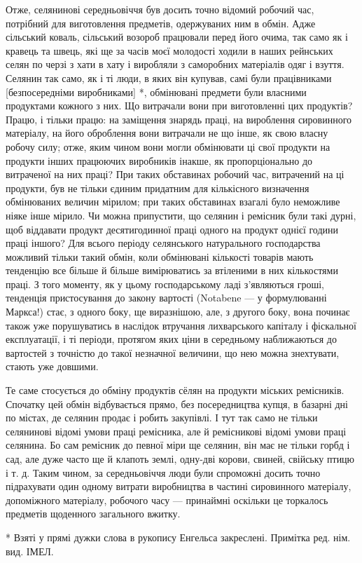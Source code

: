 Отже, селянинові середньовіччя був досить точно відомий робочий час, потрібний для виготовлення предметів, одержуваних ним в
обмін. Адже сільський коваль, сільський возороб працювали перед його очима, так само як і кравець та швець, які ще за часів
моєї молодості ходили в наших рейнських селян по черзі з хати в хату і виробляли з саморобних матеріалів одяг і взуття.
Селянин так само, як і ті люди, в яких він купував, самі були працівниками [безпосередніми виробниками] *, обмінювані
предмети були власними продуктами кожного з них. Що витрачали вони при виготовленні цих продуктів? Працю, і тільки працю: на
заміщення знарядь праці, на вироблення сировинного матеріалу, на його оброблення вони витрачали не що інше, як свою власну
робочу силу; отже, яким чином вони могли обмінювати ці свої продукти на продукти інших працюючих виробників інакше, як
пропорціонально до витраченої на них праці?  При таких обставинах робочий час, витрачений на ці продукти, був не тільки
єдиним придатним для кількісного визначення обмінюваних величин мірилом; при таких обставинах взагалі було неможливе ніяке
інше мірило. Чи можна припустити, що селянин і ремісник були такі дурні, щоб віддавати продукт десятигодинної праці одного
на продукт однієї години праці іншого? Для всього періоду селянського натурального господарства можливий тільки такий
обмін, коли обмінювані кількості товарів мають тенденцію все більше й більше вимірюватись за втіленими в них кількостями
праці. З того моменту, як у цьому господарському ладі з’являються гроші, тенденція пристосування до закону вартості
(Notabene — у формулюванні Маркса!) стає, з одного боку, ще виразнішою, але, з другого боку, вона починає також уже
порушуватись в наслідок втручання лихварського капіталу і фіскальної експлуатації, і ті періоди, протягом яких ціни в
середньому наближаються до вартостей з точністю до такої незначної величини, що нею можна знехтувати, стають уже довшими.

Те саме стосується до обміну продуктів сёлян на продукти міських ремісників. Спочатку цей обмін відбувається прямо, без
посередництва купця, в базарні дні по містах, де селянин продає і робить закупівлі. І тут так само не тільки селянинові
відомі умови праці ремісника, але й ремісникові відомі умови праці селянина. Бо сам ремісник до певної міри ще селянин, він
має не тільки горбд і сад, але дуже часто ще й клапоть землі, одну-дві корови, свиней, свійську птицю і т. д. Таким чином,
за середньовіччя люди були спроможні досить точно підрахувати один одному витрати виробництва в частині сировинного
матеріалу, допоміжного матеріалу, робочого часу — принаймні оскільки це торкалось предметів щоденного загального вжитку.

* Взяті у прямі дужки слова в рукопису Енгельса закреслені. Примітка ред. нім. вид. ІМЕЛ.
